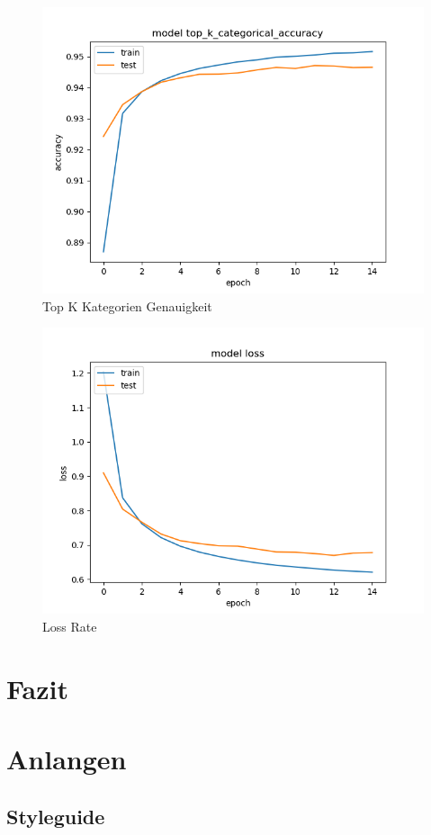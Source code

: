 \documentclass[11pt]{article}
\begin{document}
\begin{figure}[H]
	\centering
	\includegraphics[width=0.7\linewidth]{images/top_k_cat_acc}
	\caption{Top K Kategorien Genauigkeit}
	\label{fig:topkcatacc}
\end{figure}

\begin{figure}[H]
	\centering
	\includegraphics[width=0.7\linewidth]{images/loss}
	\caption{Loss Rate}
	\label{fig:loss}
\end{figure}




\section{Fazit}

\pagebreak

\section{Anlangen}
\label{chap: Anlagen}
\subsection{Styleguide}
\end{document}
